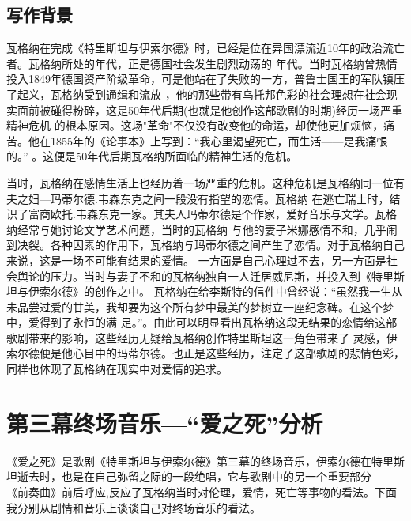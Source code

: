\documentclass[10pt,a4paper]{ctexart}
\newcommand{\upcite}[1]{\textsuperscript{\textsuperscript{\cite{#1}}}}
\begin{document}
 	\subsection*{写作背景}
    瓦格纳在完成《特里斯坦与伊索尔德》时，已经是位在异国漂流近10年的政治流亡者。瓦格纳所处的年代，正是德国社会发生剧烈动荡的
    年代。当时瓦格纳曾热情投入1849年德国资产阶级革命，可是他站在了失败的一方，普鲁士国王的军队镇压了起义，瓦格纳受到通缉和流放
    ，他的那些带有乌托邦色彩的社会理想在社会现实面前被碰得粉碎，这是50年代后期(也就是他创作这部歌剧的时期)经历一场严重精神危机
    的根本原因。这场"革命"不仅没有改变他的命运，却使他更加烦恼，痛苦。他在1855年的《论事本》上写到：“我心里渴望死亡，而生活——是我痛恨的。”
    \upcite{瓦格纳书信集}。这便是50年代后期瓦格纳所面临的精神生活的危机。

    当时，瓦格纳在感情生活上也经历着一场严重的危机。这种危机是瓦格纳同一位有夫之妇—玛蒂尔德.韦森东克之间一段没有指望的恋情。瓦格纳
    在逃亡瑞士时，结识了富商欧托.韦森东克一家。其夫人玛蒂尔德是个作家，爱好音乐与文学。瓦格纳经常与她讨论文学艺术问题，当时的瓦格纳
    与他的妻子米娜感情不和，几乎闹到决裂。各种因素的作用下，瓦格纳与玛蒂尔德之间产生了恋情。对于瓦格纳自己来说，这是一场不可能有结果的爱情。
    一方面是自己心理过不去，另一方面是社会舆论的压力。当时与妻子不和的瓦格纳独自一人迁居威尼斯，并投入到《特里斯坦与伊索尔德》的创作之中。
    瓦格纳在给李斯特的信件中曾经说：“虽然我一生从未品尝过爱的甘美，我却要为这个所有梦中最美的梦树立一座纪念碑。在这个梦中，爱得到了永恒的满
    足。”\upcite{瓦格纳李斯特}。由此可以明显看出瓦格纳这段无结果的恋情给这部歌剧带来的影响，这些经历无疑给瓦格纳创作特里斯坦这一角色带来了
    灵感，伊索尔德便是他心目中的玛蒂尔德。也正是这些经历，注定了这部歌剧的悲情色彩，同样也体现了瓦格纳在现实中对爱情的追求。
 	\section*{第三幕终场音乐—“爱之死”分析}
    《爱之死》是歌剧《特里斯坦与伊索尔德》第三幕的终场音乐，伊索尔德在特里斯坦逝去时，也是在自己弥留之际的一段绝唱，它与歌剧中的另一个重要部分——《前奏曲》前后呼应,反应了瓦格纳当时对伦理，爱情，死亡等事物的看法。下面我分别从剧情和音乐上谈谈自己对终场音乐的看法。
\end{document}
